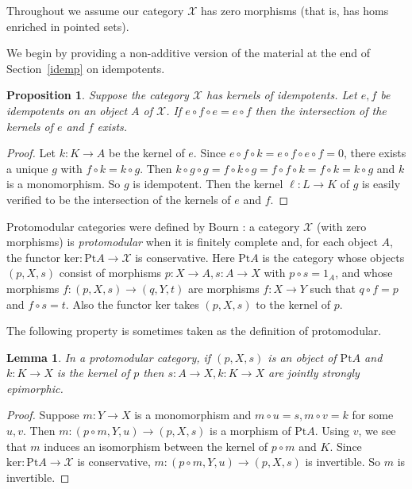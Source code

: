 \documentclass[a4paper,12pt,reqno]{amsart}
\newtheorem{lemma}[theorem]{Lemma}
\newtheorem{proposition}[theorem]{Proposition}
\theoremstyle{definition}
\theoremstyle{fact}
\theoremstyle{genquest}
\theoremstyle{step}
\newcommand{\ra}{\rightarrow}
\def\CX{{\mathscr X}}
\begin{document}
Throughout we assume our category $\CX$ has zero morphisms (that is, has homs enriched in pointed sets).

We begin by providing a non-additive version of the material at the end of Section~\ref{idemp} on idempotents. 

\begin{proposition}
Suppose the category $\CX$ has kernels of idempotents.
Let $e,f$ be idempotents on an object $A$ of $\CX$.
If $e\circ f\circ e = e\circ f$ then the intersection of the kernels of $e$ and $f$ exists.
\end{proposition}
\begin{proof}
Let $k:K\ra A$ be the kernel of $e$.
Since $e\circ f \circ k=e\circ f\circ e\circ f =0$, there exists a unique $g$ with 
$f\circ k=k\circ g$. Then $k\circ g\circ g = f\circ k\circ g=f\circ f \circ k=f\circ k=k\circ g$ and $k$ is a monomorphism. So $g$ is idempotent. Then the kernel $\ell :L\ra K$ of $g$ is easily verified to be the intersection of the kernels of $e$ and $f$.
\end{proof}

Protomodular categories were defined by Bourn \cite{Bourn91}:
a category $\CX$ (with zero morphisms) is {\em protomodular} when 
it is finitely complete and, for each object $A$, 
the functor $\mathrm{ker}: \mathrm{Pt}A\ra \CX$ is conservative. 
Here $\mathrm{Pt}A$ is the category
whose objects $(p,X,s)$ consist of morphisms $p:X\ra A, s:A\ra X$ with
$p\circ s = 1_A$, and whose morphisms $f:(p,X,s)\ra (q,Y,t)$ are morphisms
$f:X\ra Y$ such that $q\circ f = p$ and $f\circ s = t$.
Also the functor $\mathrm{ker}$ takes $(p,X,s)$ to the kernel of $p$.

The following property is sometimes \cite{BorBou07} taken as the definition of protomodular.  

\begin{lemma}\label{protolemma} 
In a protomodular category, if $(p,X,s)$ is an object of 
$\mathrm{Pt}A$ and $k:K\ra X$
is the kernel of $p$ then $s:A\ra X, k:K\ra X$ are jointly strongly epimorphic.
\end{lemma}
\begin{proof} Suppose $m:Y\ra X$ is a monomorphism and $m\circ u = s, m\circ v = k$ for some $u,v$. Then $m:(p\circ m,Y,u)\ra (p,X,s)$ is a morphism of
$\mathrm{Pt}A$. Using $v$, we see that $m$ induces an isomorphism between
the kernel of $p\circ m$ and $K$. Since $\mathrm{ker}: \mathrm{Pt}A\ra \CX$
is conservative, $m:(p\circ m,Y,u)\ra (p,X,s)$ is invertible. So $m$ is invertible.   
\end{proof}      
\end{document}
